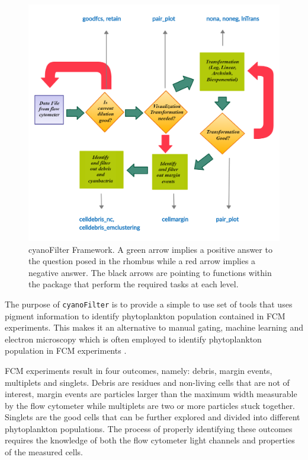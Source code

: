 \documentclass[a4paper,12pt]{extarticle}
\begin{document}
\begin{figure}[t] 
	
	\centering
	\includegraphics[scale = 0.2]{Figures/software_framework.png}
	\caption{cyanoFilter Framework. A green arrow implies a positive answer to the question posed in the rhombus while a red arrow implies a negative answer. The black arrows are pointing to functions within the package that perform the required tasks at each level.}
	\label{fig:framework}
\end{figure}

The purpose of \texttt{cyanoFilter} is to provide a simple to use set of tools that uses pigment information to identify phytoplankton population contained in FCM experiments. This makes it an alternative to manual gating, machine learning and electron microscopy which is often employed to identify phytoplankton population in FCM experiments \citep{Stopm:2007, Fontana:2017, Poniedzialek:2017}.

FCM experiments result in four outcomes, namely: debris, margin events, multiplets and singlets. Debris are residues and non-living cells that are not of interest, margin events are particles larger than the maximum width measurable by the flow cytometer while multiplets are two or more particles stuck together. Singlets are the good cells that can be further explored and divided into different phytoplankton populations. The process of properly identifying these outcomes requires the knowledge of both the flow cytometer light channels and properties of the measured cells.
\end{document}
